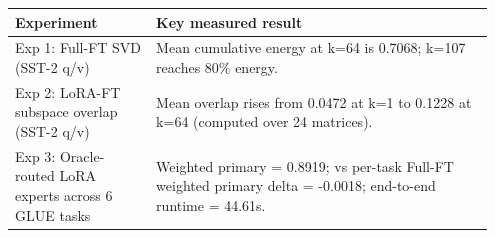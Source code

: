 \begin{tabular}{p{0.28\linewidth}p{0.67\linewidth}}
\toprule
Experiment & Key measured result \\
\midrule
Exp 1: Full-FT SVD (SST-2 q/v) & Mean cumulative energy at k=64 is 0.7068; k=107 reaches 80\% energy. \\
Exp 2: LoRA-FT subspace overlap (SST-2 q/v) & Mean overlap rises from 0.0472 at k=1 to 0.1228 at k=64 (computed over 24 matrices). \\
Exp 3: Oracle-routed LoRA experts across 6 GLUE tasks & Weighted primary = 0.8919; vs per-task Full-FT weighted primary delta = -0.0018; end-to-end runtime = 44.61s. \\
\bottomrule
\end{tabular}
